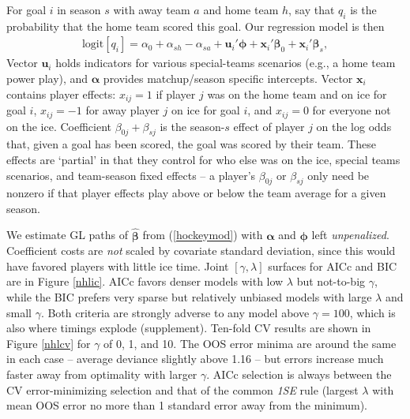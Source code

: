 \documentclass[12pt]{article}
\newcommand{\bs}[1]{\boldsymbol{#1}}
\newcommand{\mr}[1]{\mathrm{#1}}
\newcommand{\bm}[1]{\mathbf{#1}}
\begin{document}
For goal $i$ in
season $s$ with away team $a$ and home team $h$, say that $q_{i}$ is the probability that the home team scored this goal.  Our regression model is then
\begin{align}\label{hockeymod}
\mr{logit}\left[q_{i}\right] = \alpha_0 +
\alpha_{sh} - \alpha_{sa} + \bm{u}_i'\bs{\phi} + \bm{x}_i'\bs{\beta}_0 +
\bm{x}_i'\bs{\beta}_s, \end{align}  Vector $\bm{u}_i$ holds indicators for
various special-teams scenarios (e.g., a home team power play), and
$\bs{\alpha}$ provides matchup/season specific intercepts. Vector $\bm{x}_i$
contains player effects: $x_{ij}=1$ if player $j$ was on the home team and on
ice for goal $i$, $x_{ij}=-1$ for away player $j$ on ice for goal $i$, and
$x_{ij}=0$ for everyone not on the ice.   Coefficient $\beta_{0j} +
\beta_{sj}$ is the season-$s$ effect of player $j$ on the log odds that, given
a goal has been scored, the goal was scored by their team.  These effects are
`partial' in that they control for who else was on the ice, special teams
scenarios, and team-season fixed effects -- a player's $\beta_{0j}$ or $\beta_{sj}$
only need be nonzero if that player effects play above or below the team
average for a given season.

We estimate GL paths of $\bs{\hat\beta}$ from (\ref{hockeymod}) with
$\bs{\alpha}$ and $\bs{\phi}$ left {\it unpenalized}. Coefficient costs are
{\it not} scaled by covariate standard deviation, since this would have
favored players with little ice time.   Joint $[\gamma,\lambda]$ surfaces for AICc and BIC are in Figure \ref{nhlic}.
AICc favors denser models with low $\lambda$ but not-to-big $\gamma$,
while the BIC  prefers very sparse but relatively unbiased  models with large
$\lambda$ and small $\gamma$.  Both criteria are strongly adverse to any model
above $\gamma=100$, which is also where timings explode (supplement).  Ten-fold CV results are shown in Figure
\ref{nhlcv} for $\gamma$ of 0, 1, and 10.  The OOS error minima are around the
same in each case -- average deviance slightly above 1.16 -- but errors
increase much faster away from optimality with larger $\gamma$.  AICc selection is always between the CV error-minimizing selection and that of the common {\it 1SE} rule (largest $\lambda$ with mean OOS error no more than
1 standard error away from the minimum). 
\end{document}
